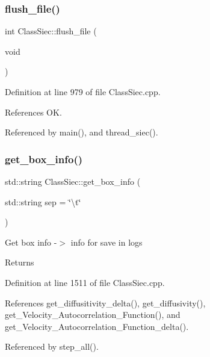 \subsubsection{\texorpdfstring{flush\+\_\+file()}{flush\_file()}}
{\footnotesize\ttfamily int Class\+Siec\+::flush\+\_\+file (\begin{DoxyParamCaption}\item[{void}]{ }\end{DoxyParamCaption})}



Definition at line 979 of file Class\+Siec.\+cpp.



References OK.



Referenced by main(), and thread\+\_\+siec().

\mbox{\label{classClassSiec_a5228f0e683612ae0a947f77a2bb7d2c9}} 
\subsubsection{\texorpdfstring{get\+\_\+box\+\_\+info()}{get\_box\_info()}}
{\footnotesize\ttfamily std\+::string Class\+Siec\+::get\+\_\+box\+\_\+info (\begin{DoxyParamCaption}\item[{std\+::string}]{sep = {\ttfamily \char`\"{}\textbackslash{}t\char`\"{}} }\end{DoxyParamCaption})}

Get box info -\/$>$ info for save in logs \begin{DoxyReturn}{Returns}

\end{DoxyReturn}


Definition at line 1511 of file Class\+Siec.\+cpp.



References get\+\_\+diffusitivity\+\_\+delta(), get\+\_\+diffusivity(), get\+\_\+\+Velocity\+\_\+\+Autocorrelation\+\_\+\+Function(), and get\+\_\+\+Velocity\+\_\+\+Autocorrelation\+\_\+\+Function\+\_\+delta().



Referenced by step\+\_\+all().

